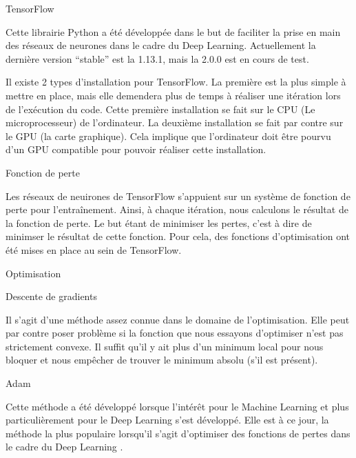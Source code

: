 \documentclass{book}
\newcommand{\p}{\vspace{0.2cm}}
\begin{document}
  \begin{chapter}{TensorFlow}

    Cette librairie Python a été développée dans le but de faciliter la prise en main des réseaux de neurones dans le cadre du Deep Learning. Actuellement la dernière version ``stable'' est la 1.13.1, mais la 2.0.0 est en cours de test.\p

    Il existe 2 types d'installation pour TensorFlow. La première est la plus simple à mettre en place, mais elle demendera plus de temps à réaliser une itération lors de l'exécution du code. Cette première installation se fait sur le CPU (Le microprocesseur) de l'ordinateur. La deuxième installation se fait par contre sur le GPU (la carte graphique). Cela implique que l'ordinateur doit être pourvu d'un GPU compatible pour pouvoir réaliser cette installation.\p

		\begin{section}{Fonction de perte}

			Les réseaux de neuirones de TensorFlow s'appuient sur un système de fonction de perte pour l'entraînement. Ainsi, à chaque itération, nous calculons le résultat de la fonction de perte. Le but étant de minimiser les pertes, c'est à dire de minimser le résultat de cette fonction. Pour cela, des fonctions d'optimisation ont été mises en place au sein de TensorFlow.\p

		\end{section}

		\begin{section}{Optimisation}

			\begin{subsection}{Descente de gradients}

				Il s'agit d'une méthode assez connue dans le domaine de l'optimisation. Elle peut par contre poser problème si la fonction que nous essayons d'optimiser n'est pas strictement convexe. Il suffit qu'il y ait plus d'un minimum local pour nous bloquer et nous empêcher de trouver le minimum absolu (s'il est présent).\p

			\end{subsection}

			\begin{subsection}{Adam}

				Cette méthode a été développé lorsque l'intérêt pour le Machine Learning et plus particulièrement pour le Deep Learning s'est développé. Elle est à ce jour, la méthode la plus populaire lorsqu'il s'agit d'optimiser des fonctions de pertes dans le cadre du Deep Learning \cite{adam}.\p


\end{subsection}
\end{section}
\end{chapter}
\end{document}

